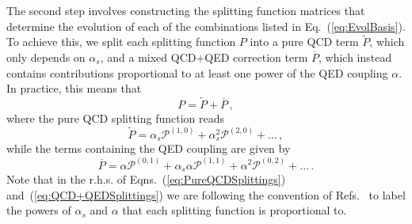 The second step involves constructing the
splitting function matrices that determine the evolution
of each of the combinations listed in Eq.~(\ref{eq:EvolBasis}).
%
To achieve this, we split each splitting function $P$ into a pure QCD term
$\widetilde{P}$, which only depends on $\alpha_s$, and a
mixed QCD+QED
correction term $\overline{P}$, which instead contains contributions proportional to at least one power of the QED coupling $\alpha$.
%
In practice, this means that
\begin{equation}
P = \widetilde{P} + \overline{P}\,,
\end{equation}
where the pure QCD splitting function reads
\begin{equation}\label{eq:PureQCDSplittings}
\widetilde{P} = \alpha_s \mathcal{P}^{(1,0)} + \alpha_s^2 \mathcal{P}^{(2,0)}+\dots\, ,
\end{equation}
while the terms containing the QED coupling are given by
\begin{equation}\label{eq:QCD+QEDSplittings}
\overline{P} = \alpha \mathcal{P}^{(0,1)} + \alpha_s\alpha \mathcal{P}^{(1,1)}+\alpha^2 \mathcal{P}^{(0,2)} + \dots \, .
\end{equation}
Note that in the r.h.s. of Eqns.~(\ref{eq:PureQCDSplittings})
and~(\ref{eq:QCD+QEDSplittings}) we are following
the convention of Refs.~\cite{deFlorian:2015ujt,deFlorian:2016gvk} to
label the powers
of $\alpha_s$ and $\alpha$ that each  splitting function
is proportional to.

